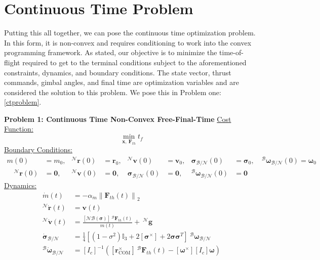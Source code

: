 \section{Continuous Time Problem}
Putting this all together, we can pose the continuous time optimization problem. In this form, it is non-convex and requires conditioning to work into the convex programming framework. As stated, our objective is to minimize the time-of-flight required to get to the terminal conditions subject to the aforementioned constraints, dynamics, and boundary conditions. The state vector, thrust commands, gimbal angles, and final time are optimization variables and are considered the solution to this problem. We pose this in Problem one: \ref{ctproblem}.
%
\clearpage
\begin{mdframed}
\label{ctproblem}
\textbf{Problem 1: Continuous Time Non-Convex Free-Final-Time}
\newline
\underline{Cost Function:}
\begin{equation*}
\min_{\mathbf{x}, \ \mathbf{F}_{th}} t_f
\end{equation*}
%
\underline{Boundary Conditions:}  
\begin{align*}
m(0) &= m_0, &^\mathcal{N}\mathbf{r}(0) &= \mathbf{r}_0, & ^\mathcal{N}\mathbf{v}(0) &= \mathbf{v}_0, & \boldsymbol{\sigma}_\mathcal{B/N}(0) &= \boldsymbol{\sigma}_0, \quad ^\mathcal{B}\boldsymbol{\omega}_\mathcal{B/N}(0) = \boldsymbol{\omega}_0 \\
\quad ^\mathcal{N}\mathbf{r}(0) &= \mathbf{0}, & ^\mathcal{N}\mathbf{v}(0) &= \mathbf{0}, & \boldsymbol{\sigma}_\mathcal{B/N}(0) &= \mathbf{0}, & ^\mathcal{B}\boldsymbol{\omega}_\mathcal{B/N}(0) &= \mathbf{0}
\end{align*}
%
\underline{Dynamics:}  
\begin{align*}
\dot{m}(t) &= -\alpha_{\dot{m}} \left\lVert \mathbf{F}_{th}(t) \right\rVert _2 \\
^\mathcal{N}\dot{\mathbf{r}}(t) &= \mathbf{v}(t) \\
^\mathcal{N}\dot{\mathbf{v}}(t) &= \frac{[\mathcal{NB}(\boldsymbol{\sigma})] \ ^\mathcal{B}\mathbf{F}_{th}(t)}{m(t)} +  \ ^\mathcal{N}\mathbf{g} \\
\dot{\boldsymbol{\sigma}}_\mathcal{B/N} &= \frac{1}{4} \left [(1-\sigma^2)\mathbb{I}_3 +  2[\boldsymbol{\sigma}^\times] + 2\boldsymbol{\sigma}\boldsymbol{\sigma}^T \right ] \ ^\mathcal{B}\boldsymbol{\omega}_\mathcal{B/N} \\
^\mathcal{B}\dot{\boldsymbol{\omega}}_\mathcal{B/N} &= [I_c]^{-1}([\boldsymbol{r}_{\text{COM}}^\times] \ ^\mathcal{B}\mathbf{F}_{th}(t) - [\boldsymbol{\omega}^\times][I_c]\boldsymbol{\omega})

\end{align*}
\end{mdframed}
